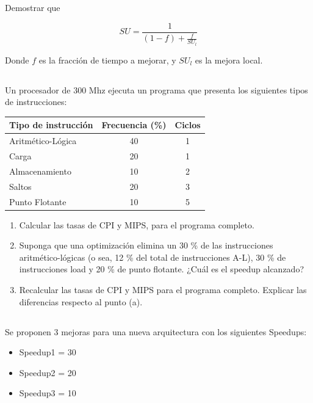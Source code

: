 \subsection{}
Demostrar que 

						 $$ SU = \frac {1} {(1-f) + \frac {f}{SU_l}} $$


Donde $f$ es la fracción de tiempo a mejorar, y $SU_l$ es la mejora local.

\subsection{}

Un procesador de 300 Mhz ejecuta un programa que presenta los siguientes tipos de instrucciones:

\begin{table}[h!]
\begin{tabular}{|l|c|c|}
\hline
 Tipo de instrucción & Frecuencia (\%)  &  Ciclos  \\ \hline
 Aritmético-Lógica & 40  &  1  \\ \hline
 Carga & 20 & 1 \\ \hline
 Almacenamiento & 10  & 2  \\ \hline
 Saltos & 20  & 3 \\ \hline
 Punto Flotante & 10 & 5  \\ \hline
\end{tabular}
\end{table}

\begin{enumerate}[label=\alph*)]
 \item Calcular las tasas de CPI y MIPS, para el programa completo.
 \item Suponga que una optimización elimina un 30 \% de las instrucciones aritmético-lógicas (o sea, 12 \% del total de instrucciones A-L), 30 \% de instrucciones load y 20 \% de punto flotante. ¿Cuál es el speedup alcanzado?
 \item Recalcular las tasas de CPI y MIPS para el programa completo. Explicar las diferencias respecto al punto (a).
\end{enumerate}

\subsection{}
Se proponen 3 mejoras para una nueva arquitectura con los siguientes Speedups:
\begin{itemize}
\item Speedup1 = 30
\item Speedup2 = 20
\item Speedup3 = 10
\end{itemize}

